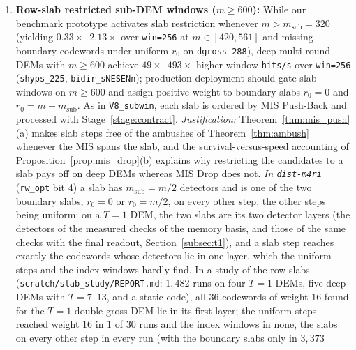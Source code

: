 \documentclass[12pt]{article}
\theoremstyle{definition}
\newcommand{\ttt}[1]{\texttt{#1}}
\begin{document}
\begin{enumerate}[label=\textbf{Stage~\arabic*.}, ref=\arabic*, wide=0pt]
    ambushes that the contraction repairs (Theorem~\ref{thm:contraction_dominance}(a)), and
    Theorem~\ref{thm:mis_push}(b) quantifies the Bucket-0 condensate that the filter removes without loss of
    weight-$d$ hits (Theorem~\ref{thm:contraction_dominance}(b), valid only with contraction enabled);
    Theorem~\ref{thm:known_gen} extends both statements to known generators of any weight and shows that the filter
    must not be extended to columns with $w_x = 3$ unless their fundamental circuits are listed.
  \item\label{stage:slab} \textbf{Row-slab restricted sub-DEM windows ($m \ge 600$):} While our benchmark prototype
    activates slab restriction whenever $m > m_{\mathrm{sub}} = 320$ (yielding $0.33\times$--$2.13\times$ over
    \ttt{win=256} at $m \in [420, 561]$ and missing boundary codewords under uniform $r_0$ on \ttt{dgross\_288}),
    deep multi-round DEMs with $m \ge 600$ achieve $49\times$--$493\times$ higher window \ttt{hits/s} over
    \ttt{win=256} (\ttt{shyps\_225}, \ttt{bidir\_sNESENn}); production deployment should gate slab windows on $m
    \ge 600$ and assign positive weight to boundary slabs $r_0 = 0$ and $r_0 = m - m_{\mathrm{sub}}$. As in
    \ttt{V8\_subwin}, each slab is ordered by MIS Push-Back and processed with Stage~\ref{stage:contract}.
    \emph{Justification:} Theorem~\ref{thm:mis_push}(a) makes slab steps free of the ambushes of
    Theorem~\ref{thm:ambush} whenever the MIS spans the slab, and the survival-versus-speed accounting of
    Proposition~\ref{prop:mis_drop}(b) explains why restricting the candidates to a slab pays off on deep DEMs
    whereas MIS Drop does not. \emph{In \ttt{dist-m4ri}} (\ttt{rw\_opt} bit 4) a slab has $m_{\mathrm{sub}} = m/2$
    detectors and is one of the two boundary slabs, $r_0 = 0$ or $r_0 = m/2$, on every other step, the other steps
    being uniform: on a $T = 1$ DEM, the two slabs are its two detector layers (the detectors of the measured checks
    of the memory basis, and those of the same checks with the final readout, Section~\ref{subsec:t1}), and a slab
    step reaches exactly the codewords whose detectors lie in one layer, which the uniform steps and the index windows
    hardly find. In a study of the row slabs (\ttt{scratch/slab\_study/REPORT.md}: $1{,}482$ runs on four $T = 1$
    DEMs, five deep DEMs with $T = 7$--$13$, and a static code), all $36$ codewords of weight $16$ found for the
    $T = 1$ double-gross DEM lie in its first layer; the uniform steps reached weight $16$ in $1$ of $30$ runs and the
    index windows in none, the slabs on every other step in every run (with the boundary slabs only in $3{,}373$

\end{enumerate}
\end{document}
